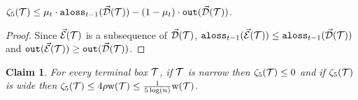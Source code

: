 \documentclass{acmsmall}
\newtheorem{claim}[theorem]{Claim}
\newcommand{\cD}{{\cal D}}
\newcommand{\cE}{{\cal E}}
\newcommand{\cT}{{\cal T}}
\newcommand{\aloss}{{\tt aloss}}
\newcommand{\outside}{{\tt out}}
\newcommand{\kappaest}{\widehat{\kappa}}
\newcommand{\width}{{\bf {\rm  w}}}
\newcommand{\errorterm}{\zeta}
\begin{document}
\begin{proposition} \label{prop:et5} $\errorterm_5(\cT) \leq \mu_t\cdot\aloss_{t-1}(\vec{\cD}(\cT))
- (1-\mu_t)\cdot \outside(\vec{\cD}(\cT))$.
\end{proposition}

\begin{proof} Since $\vec{\cE}(\cT)$ is a subsequence of $\vec{\cD}(\cT)$,
$\aloss_{t-1}(\vec{\cE}(\cT)) \leq \aloss_{t-1}(\vec{\cD}(\cT))$ and 
$\outside(\vec{\cE}(\cT)) \geq \outside(\vec{\cD}(\cT))$.
\end{proof}

%  
\begin{claim}
\label{clm:et5}
For every terminal box $\cT$, if $\cT$ is narrow then $\errorterm_5(\cT) \leq 0$ and if $\errorterm_5(\cT)$ is wide then
$\errorterm_5(\cT) 
 \leq  4\rho\width(\cT) \leq \frac{1}{5 \log(n)} \width(\cT)$.

\end{claim}
%
\end{document}
